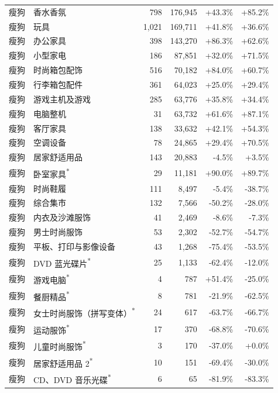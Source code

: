 \begin{longtable}{lp{5.5cm}rrrr}
瘦狗 & 香水香氛 & 798 & 176,945 & +43.3\% & +85.2\% \\
瘦狗 & 玩具 & 1,021 & 169,711 & +41.8\% & +36.6\% \\
瘦狗 & 办公家具 & 398 & 143,270 & +86.3\% & +62.6\% \\
瘦狗 & 小型家电 & 186 & 87,851 & +32.0\% & +71.5\% \\
瘦狗 & 时尚箱包配饰 & 516 & 70,182 & +84.0\% & +60.7\% \\
瘦狗 & 行李箱包配件 & 361 & 64,023 & +25.0\% & +29.4\% \\
瘦狗 & 游戏主机及游戏 & 285 & 63,776 & +35.8\% & +34.4\% \\
瘦狗 & 电脑整机 & 31 & 63,732 & +61.6\% & +87.1\% \\
瘦狗 & 客厅家具 & 138 & 33,632 & +42.1\% & +54.3\% \\
瘦狗 & 空调设备 & 78 & 24,865 & +29.4\% & +70.5\% \\
瘦狗 & 居家舒适用品 & 143 & 20,883 & -4.5\% & +3.5\% \\
瘦狗 & 卧室家具\textsuperscript{*} & 29 & 11,181 & +90.0\% & +89.7\% \\
瘦狗 & 时尚鞋履 & 111 & 8,497 & -5.4\% & -38.7\% \\
瘦狗 & 综合集市 & 132 & 7,566 & -50.2\% & -28.0\% \\
瘦狗 & 内衣及沙滩服饰 & 41 & 2,469 & -8.6\% & -7.3\% \\
瘦狗 & 男士时尚服饰 & 53 & 2,302 & -52.7\% & -54.7\% \\
瘦狗 & 平板、打印与影像设备 & 43 & 1,268 & -75.4\% & -53.5\% \\
瘦狗 & DVD 蓝光碟片\textsuperscript{*} & 25 & 1,133 & -62.4\% & -12.0\% \\
瘦狗 & 游戏电脑\textsuperscript{*} & 4 & 787 & +51.4\% & -25.0\% \\
瘦狗 & 餐厨精品\textsuperscript{*} & 8 & 781 & -21.9\% & -62.5\% \\
瘦狗 & 女士时尚服饰（拼写变体）\textsuperscript{*} & 24 & 617 & -63.7\% & -66.7\% \\
瘦狗 & 运动服饰\textsuperscript{*} & 17 & 370 & -68.8\% & -70.6\% \\
瘦狗 & 儿童时尚服饰\textsuperscript{*} & 3 & 170 & -37.0\% & +0.0\% \\
瘦狗 & 居家舒适用品 2\textsuperscript{*} & 10 & 151 & -69.4\% & -30.0\% \\
瘦狗 & CD、DVD 音乐光碟\textsuperscript{*} & 6 & 65 & -81.9\% & -83.3\% \\
\bottomrule
\end{longtable}
